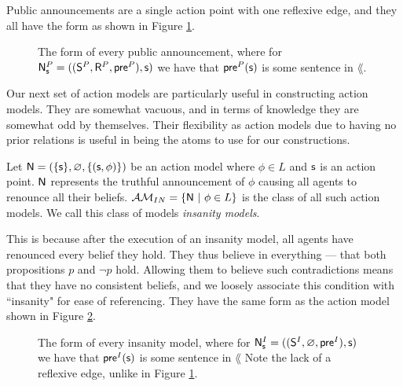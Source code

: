 Public announcements are a single action point with one reflexive edge, and they all have the form
as shown in Figure \ref{figure:exampleAnnounce}.

\begin{figure}
\centering
{}
\caption[Public announcement form]{The form of every public announcement, where for $\mathrm{\mathsf{N}}^P_\mathrm{\mathsf{s}} =
((\mathrm{\mathsf{S}}^P,\mathrm{\mathsf{R}}^P,\mathrm{\mathsf{pre}}^P),\mathrm{\mathsf{s}})$ we have that $\mathrm{\mathsf{pre}}^P(\mathrm{\mathsf{s}})$ is some sentence in $\lang$.}
\label{figure:exampleAnnounce}
\end{figure}

Our next set of action models are particularly useful in constructing action models.
They are somewhat vacuous, and in terms of knowledge they are somewhat odd by themselves.
Their flexibility as action models due to having no prior relations is useful in being the atoms to
use for our constructions.

\begin{defn} \label{insanity}
Let $\mathrm{\mathsf{\mathrm{\mathsf{N}} = (\{ s \}, \varnothing, \{(s, \phi)\})}}$ be an action model
where $\phi \in L$ and $\mathrm{\mathsf{s}}$ is an action point.
$\mathrm{\mathsf{\mathrm{\mathsf{N}}}}$ represents the truthful announcement of $\phi$ causing all agents to renounce all their beliefs.
$\mathcal{AM}_{IN} = \{\mathrm{\mathsf{\mathrm{\mathsf{N}}}} \text{ } | \text{ } \phi \in L\}$ is the class of all such action models.
We call this class of models {\em insanity models}.
\end{defn}

This is because after the execution of an insanity model, all agents have renounced every belief
they hold.
They thus believe in everything --- that both propositions $p$ and $\neg p$ hold.
Allowing them to believe such contradictions means that they have no consistent beliefs, and we
loosely associate this condition with ``insanity" for ease of referencing.
They have the same form as the action model shown in Figure \ref{figure:exampleInsane}.

\begin{figure}
\centering
{}
\caption[Insanity action model form]{The form of every insanity model, where for $\mathrm{\mathsf{N}}^I_\mathrm{\mathsf{s}} =
((\mathrm{\mathsf{S}}^I,\varnothing,\mathrm{\mathsf{pre}}^I),\mathrm{\mathsf{s}})$ we have that $\mathrm{\mathsf{pre}}^I(\mathrm{\mathsf{s}})$ is some sentence in $\lang$
Note the lack of a reflexive edge, unlike in Figure \ref{figure:exampleAnnounce}.}
\label{figure:exampleInsane}
\end{figure}

